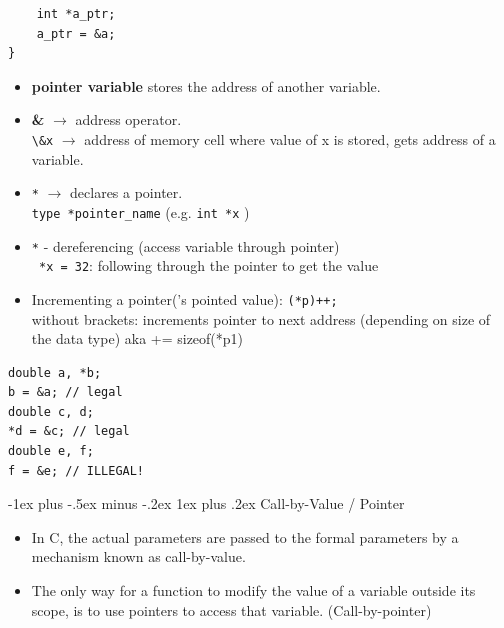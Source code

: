 \documentclass[12pt, landscape]{article}
\makeatletter
\newcommand{\code}[1]{\colorbox{gray!25!}{\lstinline[basicstyle=\scriptsize]|#1|}}
\renewcommand{\subsubsection}{\@startsection{subsubsection}{3}{0mm}%
                                {-1ex plus -.5ex minus -.2ex}%
                                {1ex plus .2ex}%
                                {\normalfont\small\bfseries}}
\makeatother
\begin{document}
\begin{multicols*}{3}
\begin{lstlisting}
	int *a_ptr;
	a_ptr = &a;
}
\end{lstlisting}
\begin{itemize}
	\item \textbf{pointer variable} stores the address of another variable.
	\item \textbf{\&} $\rightarrow$ address operator. \\
\code{\&x} $\rightarrow$ address of memory cell where value of x is stored, gets address of a variable.

	\item \code{*} $\rightarrow$ declares a pointer. \\
\code{type *pointer_name} (e.g. \code{int *x} )

	\item \code{*} - dereferencing (access variable through pointer) \\
\code{ *x = 32}: following through the pointer to get the value

	\item Incrementing a pointer('s pointed value): \code{(*p)++;} \\
without brackets: increments pointer to next address (depending
on size of the data type) aka += sizeof(*p1)
	
\end{itemize}
\begin{lstlisting}
double a, *b;
b = &a; // legal
double c, d;
*d = &c; // legal
double e, f;
f = &e; // ILLEGAL!
\end{lstlisting}

\subsubsection{Call-by-Value / Pointer}
\begin{itemize}
	\item In C, the actual parameters are passed to the formal parameters by a mechanism known as call-by-value. 
	\item The only way for a function to modify the value of a variable outside its scope, is to use pointers to access that variable. (Call-by-pointer)

\end{itemize}

\vfill\null
\columnbreak


\end{multicols*}
\end{document}
